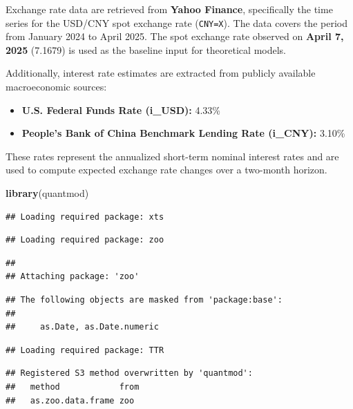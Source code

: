 \documentclass[
]{article}
\newenvironment{Shaded}{\begin{snugshade}}{\end{snugshade}}
\newcommand{\FunctionTok}[1]{\textcolor[rgb]{0.13,0.29,0.53}{\textbf{#1}}}
\newcommand{\NormalTok}[1]{#1}
\providecommand{\tightlist}{%
  \setlength{\itemsep}{0pt}\setlength{\parskip}{0pt}}
\begin{document}
Exchange rate data are retrieved from \textbf{Yahoo Finance},
specifically the time series for the USD/CNY spot exchange rate
(\texttt{CNY=X}). The data covers the period from January 2024 to April
2025. The spot exchange rate observed on \textbf{April 7, 2025} (7.1679)
is used as the baseline input for theoretical models.

Additionally, interest rate estimates are extracted from publicly
available macroeconomic sources:

\begin{itemize}
\tightlist
\item
  \textbf{U.S. Federal Funds Rate (i\_USD):} 4.33\%
\item
  \textbf{People's Bank of China Benchmark Lending Rate (i\_CNY):}
  3.10\%
\end{itemize}

These rates represent the annualized short-term nominal interest rates
and are used to compute expected exchange rate changes over a two-month
horizon.

\begin{Shaded}
\begin{Highlighting}[]
\FunctionTok{library}\NormalTok{(quantmod)}
\end{Highlighting}
\end{Shaded}

\begin{verbatim}
## Loading required package: xts
\end{verbatim}

\begin{verbatim}
## Loading required package: zoo
\end{verbatim}

\begin{verbatim}
## 
## Attaching package: 'zoo'
\end{verbatim}

\begin{verbatim}
## The following objects are masked from 'package:base':
## 
##     as.Date, as.Date.numeric
\end{verbatim}

\begin{verbatim}
## Loading required package: TTR
\end{verbatim}

\begin{verbatim}
## Registered S3 method overwritten by 'quantmod':
##   method            from
##   as.zoo.data.frame zoo
\end{verbatim}
\end{document}
